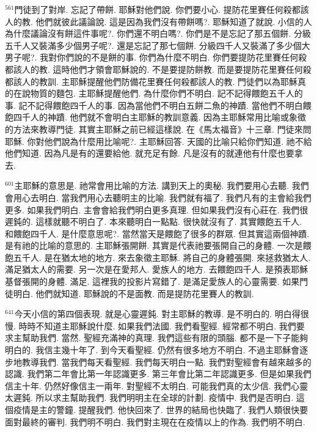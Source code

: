 \documentclass{book}
\begin{document}
$^{561}$門徒到了對岸.
忘記了帶餅.
耶穌對他們說.
你們要小心.
提防花里賽任何殺都該人的教.
他們就彼此議論說.
這是因為我們沒有帶餅嗎?.
耶穌知道了就說.
小信的人為什麼議論沒有餅這件事呢?.
你們還不明白嗎?.
你們是不是忘記了那五個餅.
分級五千人又裝滿多少個男子呢?.
還是忘記了那七個餅.
分級四千人又裝滿了多少個大男子呢?.
我對你們說的不是餅的事.
你們為什麼不明白.
你們要提防花里賽任何殺都該人的教.
這時他們才領會耶穌說的.
不是要提防餅教.
而是要提防花里賽任何殺都該人的教訓.
主耶穌提醒他們防備花里賽任何殺都該人的教.
門徒們以為耶穌真的在說物質的麵包.
主耶穌提醒他們.
為什麼你們不明白.
記不記得餵飽五千人的事.
記不記得餵飽四千人的事.
因為當他們不明白五餅二魚的神蹟.
當他們不明白餵飽四千人的神蹟.
他們就不會明白主耶穌的教訓意義.
因為主耶穌常用比喻或象徵的方法來教導門徒.
其實主耶穌之前已經這樣說.
在《馬太福音》十三章.
門徒來問耶穌.
你對他們說為什麼用比喻呢?.
主耶穌回答.
天國的比喻只給你們知道.
祂不給他們知道.
因為凡是有的還要給他.
就充足有餘.
凡是沒有的就連他有什麼也要拿去.

$^{601}$主耶穌的意思是.
祂常會用比喻的方法.
講到天上的奧秘.
我們要用心去聽.
我們會用心去明白.
當我們用心去聽明主的比喻.
我們就有福了.
我們凡有的主會給我們更多.
如果我們明白.
主會會給我們明白更多真理.
但如果我們沒有心莊在.
我們很遲鈍的.
這樣就聽不明白了.
本來聽明白一點點.
很快就沒有了.
其實餵飽五千人.
和餵飽四千人.
是什麼意思呢?.
當然當天是餵飽了很多的群眾.
但其實這兩個神蹟.
是有祂的比喻的意思的.
主耶穌張開餅.
其實是代表祂要張開自己的身體.
一次是餵飽五千人.
是在猶太地的地方.
來去象徵主耶穌.
將自己的身體張開.
來拯救猶太人.
滿足猶太人的需要.
另一次是在愛邦人.
愛族人的地方.
去餵飽四千人.
是預表耶穌基督張開的身體.
滿足.
這裡我的投影片寫錯了.
是滿足愛族人的心靈需要.
如果門徒明白.
他們就知道.
耶穌說的不是面教.
而是提防花里賽人的教訓.

$^{641}$今天小信的第四個表現.
就是心靈遲鈍.
對主耶穌的教導.
是不明白的.
明白得很慢.
時時不知道主耶穌說什麼.
如果我們法國.
我們看聖經.
經常都不明白.
我們要求主幫助我們.
當然.
聖經充滿神的真理.
我們這些有限的頭腦.
都不是一下子能夠明白的.
我信主幾十年了.
到今天看聖經.
仍然有很多地方不明白.
不過主耶穌會逐步地教導我們.
當我們每天看聖經.
我們每天明白一點.
我們對聖經會有越來越多的認識.
我們第二年會比第一年認識更多.
第三年會比第二年認識更多.
但是如果我們信主十年.
仍然好像信主一兩年.
對聖經不太明白.
可能我們真的太少信.
我們心靈太遲鈍.
所以求主幫助我們.
我們明明主在全球的計劃.
疫情中.
我們是否明白.
這個疫情是主的警鐘.
提醒我們.
他快回來了.
世界的結局也快臨了.
我們人類很快要面對最終的審判.
我們明不明白.
我們對主現在在疫情以上的作為.
我們明不明白.
\end{document}
